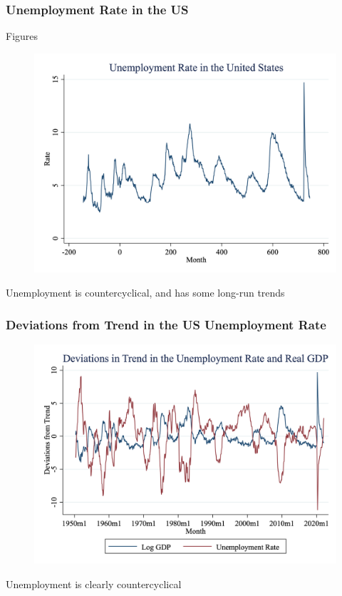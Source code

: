 \documentclass{beamer}
\begin{document}
\begin{frame}
\frametitle[alignment=center]{Unemployment Rate in the US}Figures
\begin{figure}
\centering
\includegraphics[scale=0.23]{Figures/Fig_6pt1.png}
\end{figure}
Unemployment is countercyclical, and has some long-run trends
\end{frame}

\begin{frame}
\frametitle[alignment=center]{Deviations from Trend in the US Unemployment Rate}
\begin{figure}
\centering
\includegraphics[scale=0.23]{Figures/Fig_6pt2.png}
\end{figure}
Unemployment is clearly countercyclical
\end{frame}
\end{document}
